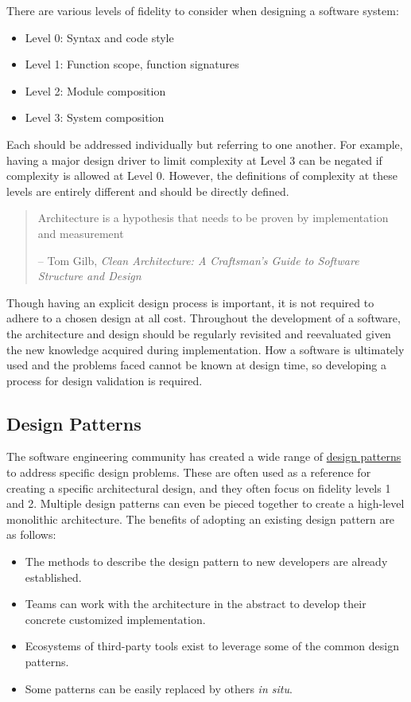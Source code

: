 \documentclass[]{nlr}
\begin{document}
There are various levels of fidelity to consider when designing a software system:
\begin{itemize}
\item Level 0: Syntax and code style
\item Level 1: Function scope, function signatures
\item Level 2: Module composition
\item Level 3: System composition
\end{itemize}

Each should be addressed individually but referring to one another. For example, having a major
design driver to limit complexity at Level 3 can be negated if complexity is allowed
at Level 0. However, the definitions of complexity at these levels are entirely different and
should be directly defined.

\begin{quote}
    Architecture is a hypothesis that needs to be proven by implementation and measurement

    -- Tom Gilb, \textit{Clean Architecture: A Craftsman's Guide to Software Structure and Design}
\end{quote}

Though having an explicit design process is important, it is not required to adhere to a chosen
design at all cost.
Throughout the development of a software, the architecture and design should be regularly
revisited and reevaluated given the new knowledge acquired during implementation.
How a software is ultimately used and the problems faced cannot be known at design time,
so developing a process for design validation is required.

\subsection{Design Patterns}
The software engineering community has created a wide range of
\href{https://en.wikipedia.org/wiki/Software_design_pattern#Classification_and_list}{design patterns}
to address specific design problems.
These are often used as a reference for creating a specific architectural design,
and they often focus on fidelity levels 1 and 2.
Multiple design patterns can even be pieced together to create a high-level monolithic architecture.
The benefits of adopting an existing design pattern are as follows:
\begin{itemize}
    
    \item The methods to describe the design pattern to new developers are already established.
    \item Teams can work with the architecture in the abstract to develop their concrete customized
        implementation.
    \item Ecosystems of third-party tools exist to leverage some of the common design patterns.
    \item Some patterns can be easily replaced by others \textit{in situ}.
\end{itemize}
\end{document}
